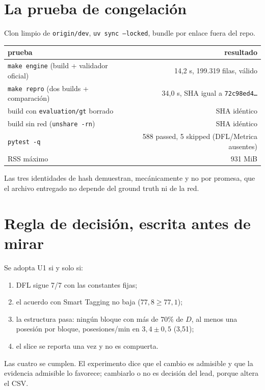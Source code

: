 \documentclass[11pt,a4paper]{article}
\begin{document}
\section{La prueba de congelación}

Clon limpio de \texttt{origin/dev}, \texttt{uv sync --locked}, bundle por enlace fuera del repo.

\begin{table}[h]
\centering
\begin{tabular}{lr}
\toprule
prueba & resultado \\
\midrule
\texttt{make engine} (build + validador oficial) & 14,2 s, 199.319 filas, válido \\
\texttt{make repro} (dos builds + comparación) & 34,0 s, SHA igual a \texttt{72c98ed4\ldots} \\
build con \texttt{evaluation/gt} borrado & SHA idéntico \\
build sin red (\texttt{unshare -rn}) & SHA idéntico \\
\texttt{pytest -q} & 588 passed, 5 skipped (DFL/Metrica ausentes) \\
RSS máximo & 931 MiB \\
\bottomrule
\end{tabular}
\end{table}

Las tres identidades de hash demuestran, mecánicamente y no por promesa, que el archivo entregado no
depende del ground truth ni de la red.

\section{Regla de decisión, escrita antes de mirar}

Se adopta U1 si y solo si:
\begin{enumerate}
\item DFL sigue 7/7 con las constantes fijas;
\item el acuerdo con Smart Tagging no baja ($77{,}8 \geq 77{,}1$);
\item la estructura pasa: ningún bloque con más de 70\% de $D$, al menos una posesión por bloque,
      posesiones/min en $3{,}4 \pm 0{,}5$ (3,51);
\item el slice se reporta una vez y no es compuerta.
\end{enumerate}
Las cuatro se cumplen. El experimento dice que el cambio es admisible y que la evidencia admisible
lo favorece; cambiarlo o no es decisión del lead, porque altera el CSV.
\end{document}
